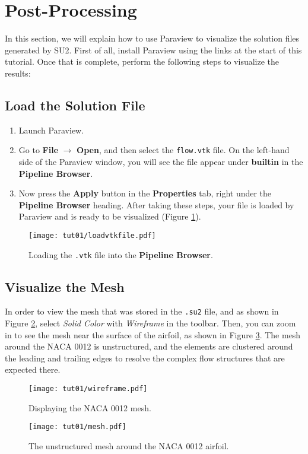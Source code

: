 \section*{Post-Processing}
In this section, we will explain how to use Paraview to visualize the solution files generated by SU2. First of all, install Paraview using the links at the start of this tutorial. Once that is complete, perform the following steps to visualize the results:
\subsection{Load the Solution File}

\begin{enumerate}[label=\arabic*)]
    \item Launch Paraview.
    \item Go to \textbf{File} $\rightarrow$ \textbf{Open}, and then select the \texttt{flow.vtk} file. On the left-hand side of the Paraview window, you will see the file appear under \textbf{builtin} in the \textbf{Pipeline Browser}.
    \item Now press the \textbf{Apply} button in the \textbf{Properties} tab, right under the \textbf{Pipeline Browser} heading. After taking these steps, your file is loaded by Paraview and is ready to be visualized (Figure \ref{fig1:load}).
\end{enumerate}
\begin{figure}[ht]
    \centering
    \texttt{[image: tut01/loadvtkfile.pdf]}
    \caption{Loading the \texttt{.vtk} file into the \textbf{Pipeline Browser}.}
    \label{fig1:load}
\end{figure}
\subsection{Visualize the Mesh}
In order to view the mesh that was stored in the \texttt{.su2} file, and as shown in Figure \ref{fig1:wireframe}, select \textit{Solid Color} with \textit{Wireframe} in the toolbar. Then, you can zoom in to see the mesh near the surface of the airfoil, as shown in Figure \ref{fig1:mesh}. The mesh around the NACA 0012 is unstructured, and the elements are clustered around the leading and trailing edges to resolve the complex flow structures that are expected there.
\begin{figure}[ht]
    \centering
    \texttt{[image: tut01/wireframe.pdf]}
    \caption{Displaying the NACA 0012 mesh.}
    \label{fig1:wireframe}
\end{figure}
\begin{figure}[ht]
    \centering
    \texttt{[image: tut01/mesh.pdf]}
    \caption{The unstructured mesh around the NACA 0012 airfoil.}
    \label{fig1:mesh}
\end{figure}
